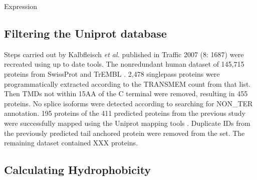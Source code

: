 Expression
\subsection{Filtering the Uniprot database}
Steps carried out by Kalbfleisch {\it et al.} published in Traffic 2007 (8: 1687) were recreated using up to date tools. The non\-redundant human dataset of 145,715 proteins from SwissProt and TrEMBL \cite{Kalbfleisch2007, TheUniProtConsortium2014}. 2,478 singlepass proteins were programmatically extracted according to the TRANSMEM count from that list. Then TMDs not within 15AA of the C terminal were removed, resulting in 455 proteins. No splice isoforms were detected according to searching for NON\_TER annotation. 195 proteins of the 411 predicted proteins from the previous study were successfully mapped using the Uniprot mapping tools \cite{TheUniProtConsortium2014}. Duplicate IDs from the previously predicted tail anchored protein were removed from the set. The remaining dataset contained XXX proteins.

\subsection{Calculating Hydrophobicity}

